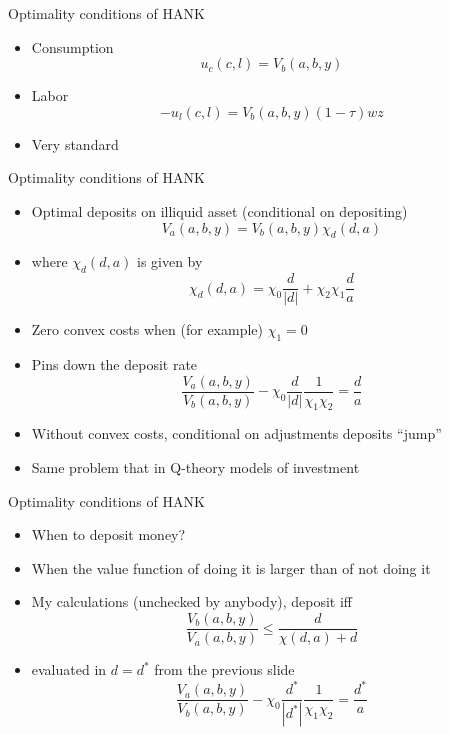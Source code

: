 \documentclass[english,xcolor=svgnames]{beamer}
\begin{document}
\begin{frame}{Optimality conditions of HANK}
\begin{itemize}
\item Consumption
\[u_c(c,l) = V_b(a,b,y)\]
\item Labor
\[-u_l(c,l) = V_b(a,b,y)(1-\tau)wz\]
\item Very standard
\end{itemize}
\end{frame}

\begin{frame}{Optimality conditions of HANK}
\begin{itemize}
\item Optimal deposits on illiquid asset (conditional on depositing)
\[V_a(a,b,y) = V_b(a,b,y) \chi_d(d,a)\]
\item where $\chi_d(d,a)$ is given by
\[\chi_d(d,a) = \chi_0 \frac{d}{|d|} + \chi_2 \chi_1 \frac{d}{a}\]
\item Zero convex costs when (for example) $\chi_1 = 0$
\item Pins down the deposit rate
\[\frac{V_a(a,b,y)}{V_b(a,b,y)} - \chi_0 \frac{d}{|d|} \frac{1}{\chi_1 \chi_2} = \frac{d}{a}\]
\item Without convex costs, conditional on adjustments deposits ``jump''
\item Same problem that in Q-theory models of investment
\end{itemize}
\end{frame}

\begin{frame}{Optimality conditions of HANK}
\begin{itemize}
\item When to deposit money?
\item When the value function of doing it is larger than of not doing it
\item My calculations (unchecked by anybody), deposit iff
\[ \frac{V_b(a,b,y)}{V_a(a,b,y)} \leq \frac{d}{\chi(d,a) + d}\]
\item evaluated in $d = d^*$  from the previous slide
\[\frac{V_a(a,b,y)}{V_b(a,b,y)} - \chi_0 \frac{d^*}{|d^*|} \frac{1}{\chi_1 \chi_2} = \frac{d^*}{a}\]
\end{itemize}
\end{frame}
\end{document}
